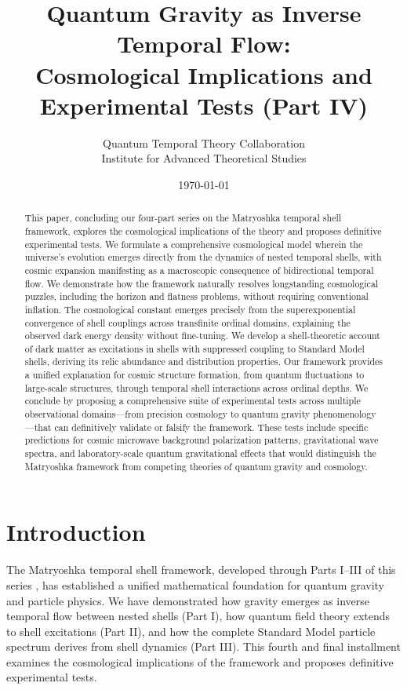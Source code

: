 \documentclass[12pt,a4paper]{article}
\title{Quantum Gravity as Inverse Temporal Flow: \\
Cosmological Implications and Experimental Tests (Part IV)}
\author{Quantum Temporal Theory Collaboration\\
Institute for Advanced Theoretical Studies}
\date{\today}
\begin{document}
\maketitle

\begin{abstract}
This paper, concluding our four-part series on the Matryoshka temporal shell framework, explores the cosmological implications of the theory and proposes definitive experimental tests. We formulate a comprehensive cosmological model wherein the universe's evolution emerges directly from the dynamics of nested temporal shells, with cosmic expansion manifesting as a macroscopic consequence of bidirectional temporal flow. We demonstrate how the framework naturally resolves longstanding cosmological puzzles, including the horizon and flatness problems, without requiring conventional inflation. The cosmological constant emerges precisely from the superexponential convergence of shell couplings across transfinite ordinal domains, explaining the observed dark energy density without fine-tuning. We develop a shell-theoretic account of dark matter as excitations in shells with suppressed coupling to Standard Model shells, deriving its relic abundance and distribution properties. Our framework provides a unified explanation for cosmic structure formation, from quantum fluctuations to large-scale structures, through temporal shell interactions across ordinal depths. We conclude by proposing a comprehensive suite of experimental tests across multiple observational domains—from precision cosmology to quantum gravity phenomenology—that can definitively validate or falsify the framework. These tests include specific predictions for cosmic microwave background polarization patterns, gravitational wave spectra, and laboratory-scale quantum gravitational effects that would distinguish the Matryoshka framework from competing theories of quantum gravity and cosmology.
\end{abstract}

\section{Introduction}

The Matryoshka temporal shell framework, developed through Parts I--III of this series \cite{matryoshka-part1, matryoshka-part2, matryoshka-part3}, has established a unified mathematical foundation for quantum gravity and particle physics. We have demonstrated how gravity emerges as inverse temporal flow between nested shells (Part I), how quantum field theory extends to shell excitations (Part II), and how the complete Standard Model particle spectrum derives from shell dynamics (Part III). This fourth and final installment examines the cosmological implications of the framework and proposes definitive experimental tests.
\end{document}
